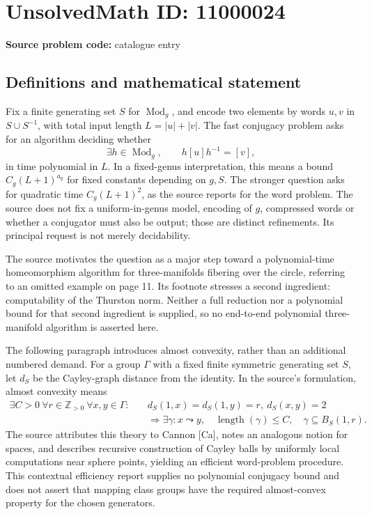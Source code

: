 \documentclass[11pt]{article}
\newcommand{\Z}{\mathbb{Z}}
\begin{document}
\section*{UnsolvedMath ID: 11000024}
\textbf{Source problem code:} catalogue entry
\subsection{Definitions and mathematical statement}
Fix a finite generating set \(S\) for \(\operatorname{Mod}_g\), and encode two elements by words \(u,v\) in \(S\cup S^{-1}\), with total input length \(L=|u|+|v|\). The fast conjugacy problem asks for an algorithm deciding whether
\[\exists h\in\operatorname{Mod}_g,\qquad h[u]h^{-1}=[v],\]
in time polynomial in \(L\). In a fixed-genus interpretation, this means a bound \(C_g(L+1)^{a_g}\) for fixed constants depending on \(g,S\). The stronger question asks for quadratic time \(C_g(L+1)^2\), as the source reports for the word problem. The source does not fix a uniform-in-genus model, encoding of \(g\), compressed words or whether a conjugator must also be output; those are distinct refinements. Its principal request is not merely decidability.

The source motivates the question as a major step toward a polynomial-time homeomorphism algorithm for three-manifolds fibering over the circle, referring to an omitted example on page 11. Its footnote stresses a second ingredient: computability of the Thurston norm. Neither a full reduction nor a polynomial bound for that second ingredient is supplied, so no end-to-end polynomial three-manifold algorithm is asserted here.

The following paragraph introduces almost convexity, rather than an additional numbered demand. For a group \(\Gamma\) with a fixed finite symmetric generating set \(S\), let \(d_S\) be the Cayley-graph distance from the identity. In the source's formulation, almost convexity means
\[\begin{split}
\exists C>0\ \forall r\in\Z_{>0}\ \forall x,y\in\Gamma:\quad
&d_S(1,x)=d_S(1,y)=r,\ d_S(x,y)=2\\
&\Longrightarrow\exists\gamma:x\leadsto y,\quad
\operatorname{length}(\gamma)\leq C,\quad\gamma\subseteq B_S(1,r).
\end{split}\]
The source attributes this theory to Cannon [Ca], notes an analogous notion for spaces, and describes recursive construction of Cayley balls by uniformly local computations near sphere points, yielding an efficient word-problem procedure. This contextual efficiency report supplies no polynomial conjugacy bound and does not assert that mapping class groups have the required almost-convex property for the chosen generators.
\end{document}

